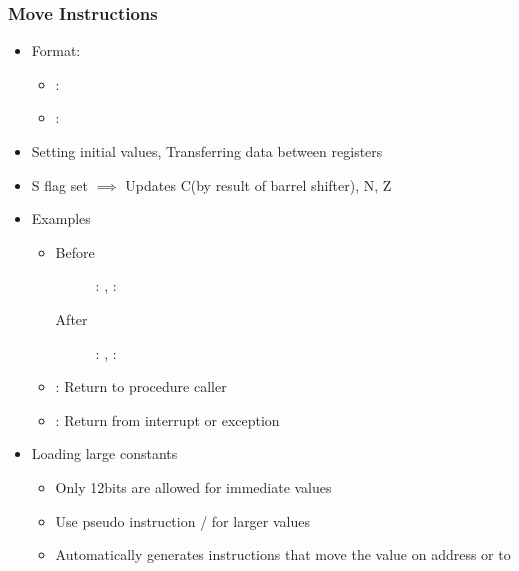 \subsubsection*{Move Instructions}
\begin{itemize}
    \item Format: 
    \begin{itemize}
        \item {}: 
        \item {}: 
    \end{itemize}
    \item Setting initial values, Transferring data between registers
    \item S flag set $\implies$ Updates C(by result of barrel shifter), N, Z
    \item Examples
    \begin{itemize}
        \item {}
        \begin{description}
            \item[Before] : , : 
            \item[After] : , : 
        \end{description}
        \item {}: Return to procedure caller
        \item {}: Return from interrupt or exception
    \end{itemize}
    \item Loading large constants
    \begin{itemize}
        \item Only 12bits are allowed for immediate values
        \item Use pseudo instruction  /  for larger values
        \item Automatically generates instructions that move the value on address  or  to 
    \end{itemize}
\end{itemize}
